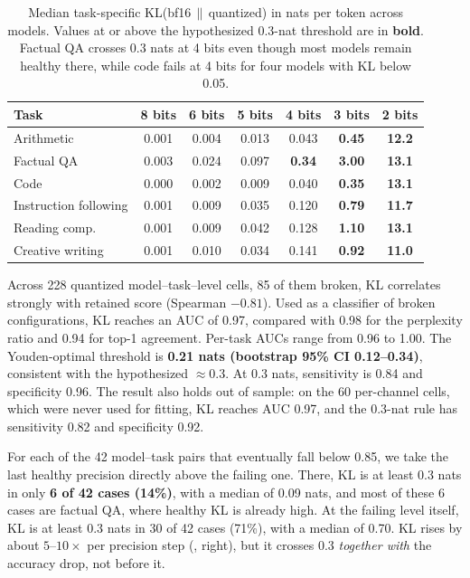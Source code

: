 \begin{table}[t]
\centering
\caption{Median task-specific KL(bf16\,$\|$\,quantized) in nats per token across models. Values at or above the hypothesized 0.3-nat threshold are in \textbf{bold}. Factual QA crosses 0.3 nats at 4 bits even though most models remain healthy there, while code fails at 4 bits for four models with KL below 0.05.}
\label{tab:kl}
\begin{tabular}{@{}lcccccc@{}}
\toprule
\textbf{Task} & \textbf{8 bits} & \textbf{6 bits} & \textbf{5 bits} & \textbf{4 bits} & \textbf{3 bits} & \textbf{2 bits} \\
\midrule
Arithmetic & 0.001 & 0.004 & 0.013 & 0.043 & \textbf{0.45} & \textbf{12.2} \\
Factual QA & 0.003 & 0.024 & 0.097 & \textbf{0.34} & \textbf{3.00} & \textbf{13.1} \\
Code & 0.000 & 0.002 & 0.009 & 0.040 & \textbf{0.35} & \textbf{13.1} \\
Instruction following & 0.001 & 0.009 & 0.035 & 0.120 & \textbf{0.79} & \textbf{11.7} \\
Reading comp. & 0.001 & 0.009 & 0.042 & 0.128 & \textbf{1.10} & \textbf{13.1} \\
Creative writing & 0.001 & 0.010 & 0.034 & 0.141 & \textbf{0.92} & \textbf{11.0} \\
\bottomrule
\end{tabular}
\end{table}

 Across 228 quantized model--task--level cells, 85 of them broken, KL correlates strongly with retained score (Spearman $-0.81$). Used as a classifier of broken configurations, KL reaches an AUC of 0.97, compared with 0.98 for the \wikitext perplexity ratio and 0.94 for top-1 agreement. Per-task AUCs range from 0.96 to 1.00. The Youden-optimal threshold is \textbf{0.21 nats (bootstrap 95\% CI 0.12--0.34)}, consistent with the hypothesized $\approx$0.3. At 0.3 nats, sensitivity is 0.84 and specificity 0.96. The result also holds out of sample: on the 60 per-channel cells, which were never used for fitting, KL reaches AUC 0.97, and the 0.3-nat rule has sensitivity 0.82 and specificity 0.92.

 For each of the 42 model--task pairs that eventually fall below 0.85, we take the last healthy precision directly above the failing one. There, KL is at least 0.3 nats in only \textbf{6 of 42 cases (14\%)}, with a median of 0.09 nats, and most of these 6 cases are factual QA, where healthy KL is already high. At the failing level itself, KL is at least 0.3 nats in 30 of 42 cases (71\%), with a median of 0.70. KL rises by about $5$--$10\times$ per precision step (, right), but it crosses 0.3 \emph{together with} the accuracy drop, not before it.

